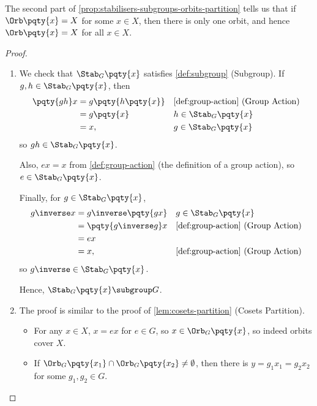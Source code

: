\begin{remark}
    The second part of \autoref{prop:stabilisers-subgroups-orbits-partition} tells us that if \(\Orb\pqty{x} = X\) for some \(x \in X\), then there is only one orbit, and hence \(\Orb\pqty{x} = X\) for all \(x \in X\).
\end{remark}

\begin{proof}
    \begin{enumerate}
        \item We check that \(\Stab_{G} \pqty{x}\) satisfies \autoref{def:subgroup} (Subgroup). If \(g, h \in \Stab_{G}\pqty{x}\), then
        \begin{align*}
            \pqty{gh} x &= g\pqty{h\pqty{x}} && \text{\autoref{def:group-action} (Group Action)} \\
            &= g\pqty{x} && h \in \Stab_{G} \pqty{x} \\
            &= x, && g \in \Stab_{G} \pqty{x}
        \end{align*}
        so \(gh \in \Stab_{G} \pqty{x}\).

        Also, \(ex = x\) from \autoref{def:group-action} (the definition of a group action), so \(e \in \Stab_G \pqty{x}\).

        Finally, for \(g \in \Stab_G \pqty{x}\),
        \begin{align*}
            g\inverse x &= g\inverse \pqty{gx} && g \in \Stab_{G} \pqty{x} \\
            &= \pqty{g\inverse g} x && \text{\autoref{def:group-action} (Group Action)} \\
            &= ex \\
            &= x, && \text{\autoref{def:group-action} (Group Action)}
        \end{align*}
        so \(g\inverse \in \Stab_{G} \pqty{x}\).

        Hence, \(\Stab_{G} \pqty{x} \subgroup G\).

        \item The proof is similar to the proof of \autoref{lem:cosets-partition} (Cosets Partition).
        \begin{itemize}
            \item For any \(x \in X\), \(x = ex\) for \(e \in G\), so \(x \in \Orb_G \pqty{x}\), so indeed orbits cover \(X\).
            \item If \(\Orb_{G} \pqty{x_1} \cap \Orb_{G} \pqty{x_2} \neq \emptyset\), then there is \(y = g_1 x_1 = g_2 x_2\) for some \(g_1, g_2 \in G\).
        

\end{itemize}
\end{enumerate}
\end{proof}
